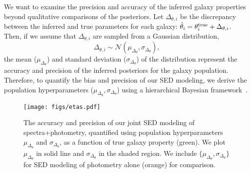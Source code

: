 We want to examine the precision and accuracy of the inferred galaxy properties
beyond qualitative comparisons of the posteriors. 
Let $\Delta_{\theta,i}$ be the discrepancy between the inferred and true
parameters for each galaxy: $\hat{\theta}_i = \theta^{\rm true}_i +
\Delta_{\theta,i}$.
Then, if we assume that $\Delta_{\theta,i}$ are sampled from a Gaussian
distribution,
\begin{equation} \label{eq:eta_gauss}
    \Delta_{\theta,i} \sim \mathcal{N}(\mu_{\Delta_{\theta}}, \sigma_{\Delta_{\theta}}),
\end{equation}
the mean ($\mu_{\Delta_{\theta}}$) and standard deviation
($\sigma_{\Delta_{\theta}}$) of the distribution represent the accuracy and
precision of the inferred posteriors for the galaxy population. 
Therefore, to quantify the bias and precision of our SED modeling, we derive the 
population hyperparameters ($\mu_{\Delta_{\theta}}, \sigma_{\Delta_{\theta}}$)
using a hierarchical Bayesian framework~\citep[\emph{e.g.}][]{hogg2010,
foreman-mackey2014, baronchelli2020}.


\begin{figure}
\begin{center}
    \texttt{[image: figs/etas.pdf]} \label{fig:etas}
    \caption{
        The accuracy and precision of our joint SED modeling of
        spectra+photometry, quantified using population hyperparameters
        $\mu_{\Delta_{\theta}}$ and $\sigma_{\Delta_{\theta}}$, as a function
        of true galaxy property (green). 
        We plot $\mu_{\Delta_{\theta}}$ in solid line and
        $\sigma_{\Delta_{\theta}}$ in the shaded region.
        We include $\{\mu_{\Delta_{\theta}}, \sigma_{\Delta_{\theta}}\}$ for SED
        modeling of photometry alone (orange) for comparison. 
    }
\end{center}
\end{figure}

